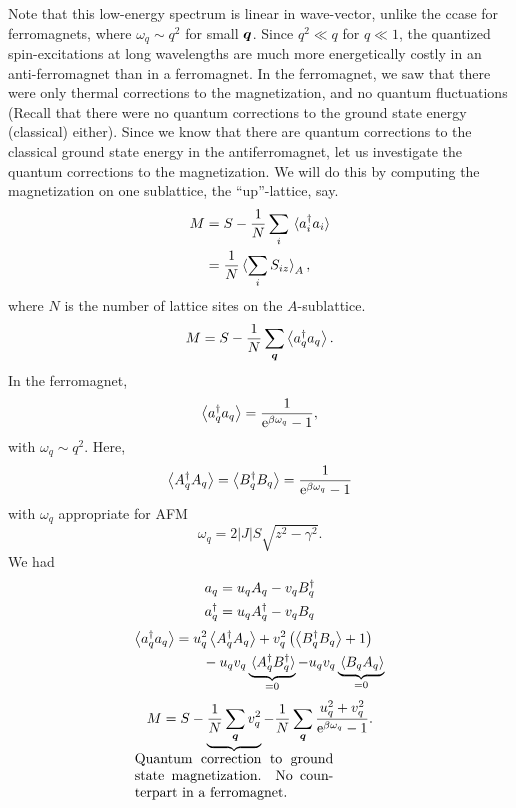 Note that this low-energy spectrum is linear in wave-vector, unlike the ccase for ferromagnets, where $\omega_q \sim q^2$ for small $\bm{q}$. Since $q^2 \ll q$ for $q\ll 1$, the quantized spin-excitations at long wavelengths are much more energetically costly in an anti-ferromagnet than in a ferromagnet. 
In the ferromagnet, we saw that there were only thermal corrections to the magnetization, and no quantum fluctuations (Recall that there were no quantum corrections to the ground state energy (classical) either).
Since we know that there are quantum corrections to the classical ground state energy in the antiferromagnet, let us investigate the quantum corrections to the magnetization.
We will do this by computing the magnetization on one sublattice, the ``up''-lattice, say. 
\begin{align}
	M &=S - \frac{1}{N}\sum_{i}\ev*{a_{i}^{\dg}a_{i}}\\
	&= \frac{1}{N}\ev*{\sum_{i}S_{iz}}_A,
\end{align}
where $N$ is the number of lattice sites on the $A$-sublattice.
\begin{equation}
	M = S - \frac{1}{N}\sum_{\vq}\ev{a_{q}^{\dg}a_{q}}.
\end{equation}
In the ferromagnet, 
\begin{equation}
	\ev{a_{q}^{\dg}a_{q}} = \frac{1}{\e^{\beta\omega_q}-1}, 
\end{equation}
with $\omega_q \sim q^2$. Here, 
\begin{equation}
	\ev{A_{q}^{\dg}A_{q}}=	\ev{B_{q}^{\dg}B_{q}} = \frac{1}{\e^{\beta\omega_q}-1}
\end{equation}
with $\omega_q$ appropriate for AFM
\begin{equation}
	\omega_q = 2|J|S\sqrt{z^2-\gamma^2}.
\end{equation}
We had 
\begin{align*}
	a_{q} &= u_{q}A_{q}-v_{q}B_{q}^{\dagger} \\ a_{q}^{\dagger} &= u_{q}A_{q}^{\dagger}-v_{q}B_{q}
\end{align*}
\begin{align*}
	\ev{a_{q}^{\dg}a_{q}} &= u_{q}^2\ev{A_{q}^{\dg}A_{q}} + v_q^2\left (\ev{B_{q}^{\dg}B_{q}}+1\right ) \\
	&\qquad  - u_qv_q \underbrace{\ev*{A_{q}^{\dg}B_{q}^{\dg}}}_{=0} - u_qv_q\underbrace{\ev*{B_{q}A_{q}}}_{=0}
\end{align*}
\begin{equation}
	M = S - \underbrace{\frac{1}{N}\sum_{\vq}v_q^2}_{\mathclap{\parbox[h]{5cm}{Quantum correction to ground state magnetization. No counterpart in a ferromagnet.}}} - \frac{1}{N}\sum_{\vq}\frac{u_q^2 + v_q^2}{\e^{\beta\omega_q}-1}.
\end{equation}
